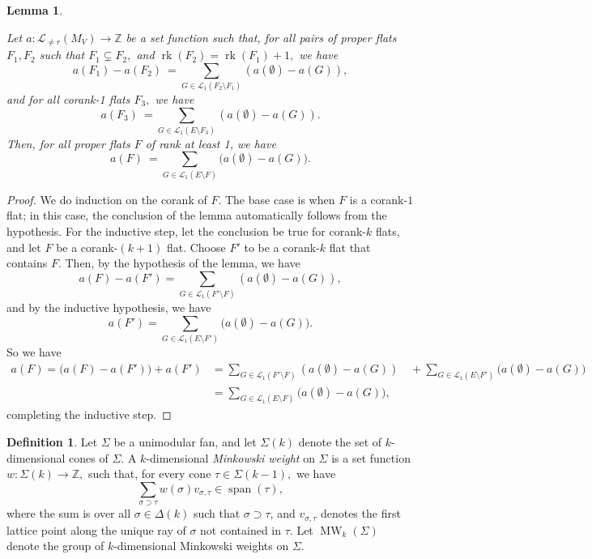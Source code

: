 \documentclass{amsart}
\theoremstyle{plain}
\newtheorem{lemma}[theorem]{Lemma}
\theoremstyle{definition}
\newtheorem{definition}[theorem]{Definition}
\newcommand{\rk}{\operatorname{rk}}
\newcommand{\Span}{\operatorname{span}}
\newcommand{\MW}{\operatorname{MW}}
\begin{document}
\begin{lemma}
\label{lem:alternate_equations}

Let $a: \mathcal{L}_{\neq r}(M_V) \to \mathbb{Z}$ be a set function such that, for all pairs of proper flats $F_1, F_2$ such that $F_1 \subsetneq F_2,$ and
$\rk(F_2) =\rk(F_1) + 1,$ we have
\[a(F_1) - a(F_2) \ = \sum_{G \in \mathcal{L}_1(F_2 \setminus F_1)}(a(\emptyset) - a(G)),\]
and for all corank-1 flats $F_3,$ we have
\[a(F_3) \ =\sum_{G \in \mathcal{L}_1(E \setminus F_3)}(a(\emptyset) - a(G)).\]
Then, for all proper flats $F$ of rank at least 1, we have
\[a(F) \ =\sum_{G \in \mathcal{L}_1(E \setminus F)} \big( a(\emptyset) - a(G)\big).\]
\end{lemma}
\begin{proof}
We do induction on the corank of $F$. The base case is when $F$ is a corank-$1$ flat; in this case, the conclusion of the lemma automatically follows from the hypothesis. For the inductive step, let the conclusion be true for corank-$k$ flats, and let $F$ be a corank-$(k+1)$ flat. Choose $F'$ to be a corank-$k$ flat that contains $F$. Then, by the hypothesis of the lemma, we have
\[a(F) - a(F') = \sum_{G \in \mathcal{L}_1(F' \setminus F)}(a(\emptyset) - a(G)), \]
and by the inductive hypothesis, we have
\[a(F')=\sum_{G \in \mathcal{L}_1(E \setminus F')} \big( a(\emptyset) - a(G)\big).\]
So we have
\begin{equation*}
\begin{split}
a(F)= \big(a(F) - a(F') \big) + a(F') & = \sum_{G \in \mathcal{L}_1(F' \setminus F)}(a(\emptyset) - a(G)) \quad + \sum_{G \in \mathcal{L}_1(E \setminus F')} \big( a(\emptyset) - a(G)\big) \\ & =  \sum_{G \in \mathcal{L}_1(E \setminus F)} \big( a(\emptyset) - a(G)\big),
\end{split}
\end{equation*}
completing the inductive step.
\end{proof}

\begin{definition}
\label{def:minkowski_weight}
Let $\Sigma$ be a unimodular fan, and let $\Sigma(k)$ denote the set of $k$-dimensional cones of $\Sigma$. A $k$-dimensional \textit{Minkowski weight} on $\Sigma$ is a set function $w: \Sigma(k) \to \mathbb{Z},$ such that, for every cone $\tau \in \Sigma(k-1),$ we have
\[\sum_{\sigma \supset \tau} w(\sigma) v_{\sigma, \tau} \in \Span(\tau),\]
where the sum is over all $\sigma \in \Delta(k)$ such that $\sigma \supset \tau$, and $v_{\sigma, \tau}$ denotes the first lattice point along the unique ray of $\sigma$ not contained in $\tau.$ Let $\MW_k(\Sigma)$ denote the group of $k$-dimensional Minkowski weights on $\Sigma.$
\end{definition}
\end{document}
